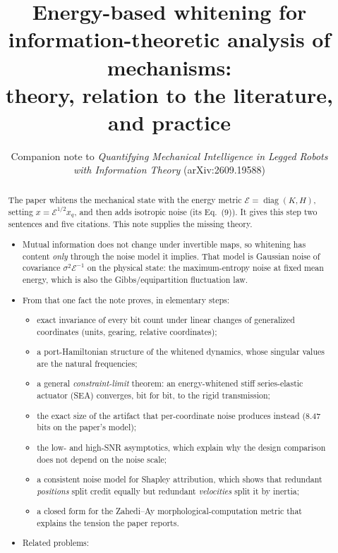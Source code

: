 \documentclass[11pt]{article}
\title{Energy-based whitening for information-theoretic analysis of mechanisms:\\
theory, relation to the literature, and practice}
\author{Companion note to \emph{Quantifying Mechanical Intelligence in Legged Robots}\\
\emph{with Information Theory} (arXiv:2609.19588)}
\date{}
\theoremstyle{definition}
\theoremstyle{remark}
\newcommand{\diag}{\operatorname{diag}}
\newcommand{\Em}{\mathcal{E}}         %
\begin{document}
\maketitle

\begin{abstract}
The paper whitens the mechanical state with the energy metric $\Em = \diag(K,H)$, setting
$x = \Em^{1/2}x_q$, and then adds isotropic noise (its Eq.~(9)). It gives this step two
sentences and five citations. This note supplies the missing theory.
\begin{itemize}[nosep]
  \item Mutual information does not change under invertible maps, so whitening has content
        \emph{only} through the noise model it implies. That model is Gaussian noise of
        covariance $\sigma^2\Em^{-1}$ on the physical state: the maximum-entropy noise at
        fixed mean energy, which is also the Gibbs/equipartition fluctuation law.
  \item From that one fact the note proves, in elementary steps:
  \begin{itemize}[nosep]
    \item exact invariance of every bit count under linear changes of generalized
          coordinates (units, gearing, relative coordinates);
    \item a port-Hamiltonian structure of the whitened dynamics, whose singular values are
          the natural frequencies;
    \item a general \emph{constraint-limit} theorem: an energy-whitened stiff
          series-elastic actuator (SEA) converges, bit for bit, to the rigid transmission;
    \item the exact size of the artifact that per-coordinate noise produces instead
          (8.47 bits on the paper's model);
    \item the low- and high-SNR asymptotics, which explain why the design comparison
          does not depend on the noise scale;
    \item a consistent noise model for Shapley attribution, which shows that redundant
          \emph{positions} split credit equally but redundant \emph{velocities} split it
          by inertia;
    \item a closed form for the Zahedi--Ay morphological-computation metric that explains
          the tension the paper reports.
  \end{itemize}
  \item Related problems:
  \begin{itemize}[nosep]

\end{itemize}
\end{itemize}
\end{abstract}
\end{document}
